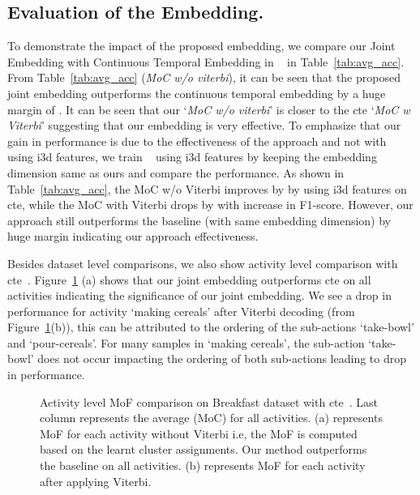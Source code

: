 \documentclass[final]{cvpr}
\begin{document}
\subsection{Evaluation of the Embedding.}
\label{sec:embed_eval}
To demonstrate the impact of the proposed embedding, we compare our Joint Embedding with Continuous Temporal Embedding in ~\cite{kukleva2019unsupervised} in Table~\ref{tab:avg_acc}. From Table~\ref{tab:avg_acc} (\textit{MoC w/o viterbi}), it can be seen that the proposed joint embedding outperforms the continuous temporal embedding by a huge margin of . It can be seen that our `\textit{MoC w/o viterbi}' is closer to the {\sc cte} `\textit{MoC w Viterbi}' suggesting that our embedding is very effective. To emphasize that our gain in performance is due to the effectiveness of the approach and not with using {\sc i3d} features, we train ~\cite{kukleva2019unsupervised} using {\sc i3d} features by keeping the embedding dimension same as ours and compare the performance. As shown in Table~\ref{tab:avg_acc}, the MoC w/o Viterbi improves by  by using {\sc i3d} features on {\sc cte}, while the MoC with Viterbi drops by  with  increase in F1-score. However, our approach still outperforms the baseline (with same embedding dimension) by huge margin indicating our approach effectiveness.

Besides dataset level comparisons, we also show activity level comparison with {\sc cte}~\cite{kukleva2019unsupervised}. Figure~\ref{fig:acc_bf} (a) shows that our joint embedding outperforms {\sc cte} on all activities indicating the significance of our joint embedding. 
We see a drop in performance for activity `making cereals' after Viterbi decoding (from Figure~\ref{fig:acc_bf}(b)), this can be attributed to the ordering of the sub-actions `take-bowl' and `pour-cereals'. For many samples in `making cereals', the sub-action `take-bowl' does not occur impacting the ordering of both sub-actions leading to drop in performance.

\begin{figure}[t]
\centering
\hfil
{}
\caption{{\small Activity level MoF comparison on Breakfast dataset with {\sc cte}~\cite{kukleva2019unsupervised}. Last column represents the average (MoC) for all activities. (a) represents MoF for each activity without Viterbi i.e, the MoF is computed based on the learnt cluster assignments. Our method outperforms the baseline on all activities. (b) represents MoF for each activity after applying Viterbi.
}}\vspace{-0.3cm}
\label{fig:acc_bf}
\end{figure}
\end{document}
